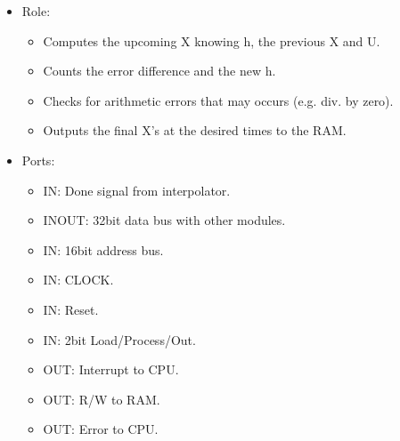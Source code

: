 \documentclass[12pt]{extarticle}
\begin{document}
\begin{itemize}
    \item Role:
    \begin{itemize}
        \item Computes the upcoming X knowing h, the previous X and U.
        \item Counts the error difference and the new h.
        \item Checks for arithmetic errors that may occurs (e.g. div. by zero).
        \item Outputs the final X's at the desired times to the RAM.
    \end{itemize}
    \item Ports:
    \begin{itemize}
        \item IN: Done signal from interpolator.
        \item INOUT: 32bit data bus with other modules.
        \item IN: 16bit address bus.
        \item IN: CLOCK.
        \item IN: Reset.
        \item IN: 2bit Load/Process/Out.
        \item OUT: Interrupt to CPU.
        \item OUT: R/W to RAM.
        \item OUT: Error to CPU.
    \end{itemize}
\end{itemize}
\end{document}
